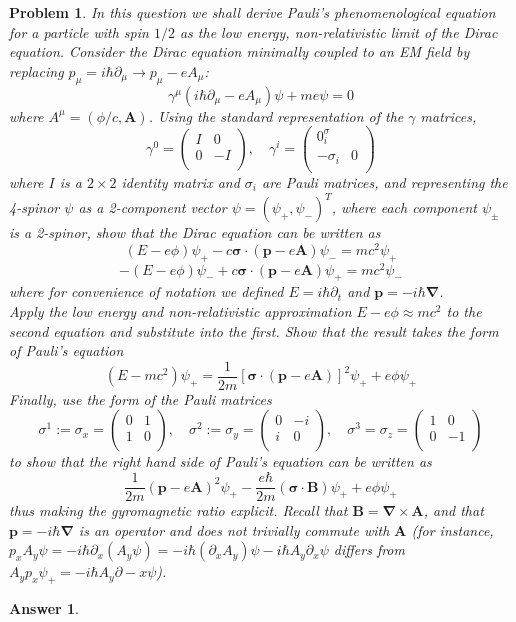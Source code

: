 \documentclass[a4paper]{article}
\newtheorem{ans}{Answer}[section]
\theoremstyle{new}
\newtheorem{qns}{Problem}[section]
\begin{document}
\begin{qns}
In this question we shall derive Pauli’s phenomenological equation for a particle with spin $1/2$ as the low energy, non-relativistic limit of the Dirac equation. Consider the Dirac equation minimally coupled to an EM field by replacing $p_\mu=i\hbar\partial_\mu\rightarrow p_\mu-eA_\mu$:
$$\gamma^\mu(i\hbar\partial_\mu-eA_\mu)\psi+me\psi=0$$
where $A^\mu=(\phi/c,\mathbf{A})$. Using the standard representation of the $\gamma$ matrices,
$$\gamma^0=\begin{pmatrix}I&0\\0&-I\\\end{pmatrix},\quad\gamma^i=\begin{pmatrix}0^\sigma_i\\-\sigma_i&0\\\end{pmatrix}$$
where $I$ is a $2\times2$ identity matrix and $\sigma_i$ are Pauli matrices, and representing the 4-spinor $\psi$ as a 2-component vector $\psi= (\psi_+, \psi_-)^T$, where each component $\psi_\pm$ is a 2-spinor, show that the Dirac equation can be written as
$$(E-e\phi)\psi_+-c\boldsymbol{\sigma}\cdot(\mathbf{p}-e\mathbf{A})\psi_-=mc^2\psi_+$$
$$-(E-e\phi)\psi_-+c\boldsymbol{\sigma}\cdot(\mathbf{p}-e\mathbf{A})\psi_+=mc^2\psi_-$$
where for convenience of notation we defined $E=i\hbar\partial_t$ and $\mathbf{p}=-i\hbar\boldsymbol{\nabla}$.\\[5pt]
Apply the low energy and non-relativistic approximation $E-e\phi\approx mc^2$ to the second equation and substitute into the first. Show that the result takes the form of Pauli’s equation
$$(E-mc^2)\psi_+=\frac{1}{2m}[\boldsymbol{\sigma}\cdot(\mathbf{p}-e\mathbf{A})]^2\psi_++e\phi\psi_+$$
Finally, use the form of the Pauli matrices
$$\sigma^1:=\sigma_x=\begin{pmatrix}0&1\\1&0\\\end{pmatrix},\quad\sigma^2:=\sigma_y=\begin{pmatrix}0&-i\\i&0\\\end{pmatrix},\quad\sigma^3=\sigma_z=\begin{pmatrix}1&0\\0&-1\\\end{pmatrix}$$
to show that the right hand side of Pauli’s equation can be written as
$$\frac{1}{2m}(\mathbf{p}-e\mathbf{A})^2\psi_+-\frac{e\hbar}{2m}(\boldsymbol{\sigma}\cdot\mathbf{B})\psi_++e\phi\psi_+$$
thus making the gyromagnetic ratio explicit. Recall that $\mathbf{B}=\boldsymbol{\nabla}\times\mathbf{A}$, and that $\mathbf{p}=-i\hbar\boldsymbol{\nabla}$ is an operator and does not trivially commute with $\mathbf{A}$ (for instance, $p_xA_y\psi = −i\hbar\partial_x(A_y\psi) =
−i\hbar(\partial_xA_y)\psi − i\hbar A_y\partial_x\psi$ differs from $A_yp_x\psi_+=-i\hbar A_y\partial-x\psi$).
\end{qns}
\begin{ans}

\end{ans}
\end{document}
